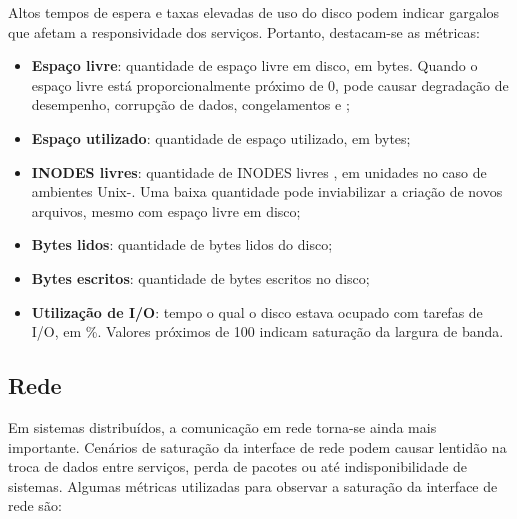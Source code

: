 Altos tempos de espera e taxas elevadas de uso do disco podem indicar gargalos que afetam a responsividade dos serviços. Portanto, destacam-se as métricas:

\begin{itemize}
\item \textbf{Espaço livre}: quantidade de espaço livre em disco, em bytes. Quando o espaço livre está proporcionalmente próximo de 0, pode causar degradação de desempenho, corrupção de dados, congelamentos e ;

\item \textbf{Espaço utilizado}: quantidade de espaço utilizado, em bytes;

\item \textbf{INODES livres}: quantidade de INODES livres \citep{inodes2025}, em unidades no caso de ambientes Unix-. Uma baixa quantidade pode inviabilizar a criação de novos arquivos, mesmo com espaço livre em disco;

\item \textbf{Bytes lidos}: quantidade de bytes lidos do disco;

\item \textbf{Bytes escritos}: quantidade de bytes escritos no disco;

\item \textbf{Utilização de I/O}: tempo o qual o disco estava ocupado com tarefas de I/O, em \%. Valores próximos de 100 indicam saturação da largura de banda.
\end{itemize}

\subsection{Rede}
\label{subsection:Rede}

Em sistemas distribuídos, a comunicação em rede torna-se ainda mais importante. Cenários de saturação da interface de rede \citep{netmetrics2025} podem causar lentidão na troca de dados entre serviços, perda de pacotes ou até indisponibilidade de sistemas. Algumas métricas utilizadas para observar a saturação da interface de rede são:

